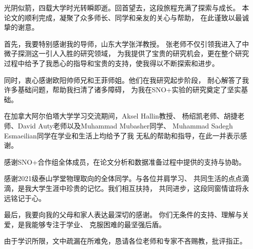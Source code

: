 \acknowledgment


光阴似箭，四载大学时光转瞬即逝。回首望去，这段旅程充满了探索与成长。
本论文的顺利完成，凝聚了众多师长、同学和亲友的关心与帮助，
在此谨致以最诚挚的谢意。

首先，我要特别感谢我的导师，山东大学张洋教授。
张老师不仅引领我进入了中微子探测这一引人入胜的研究领域，
为我提供了宝贵的研究机会，更在整个研究过程中给予了我悉心的指导和宝贵的支持，使我得以不断探索和进步。

同时，衷心感谢欧阳帅师兄和王菲师姐。他们在我研究起步阶段，
耐心解答了我许多基础问题，帮助我扫清了诸多障碍，
为我在SNO+实验的研究奠定了坚实基础。

在加拿大阿尔伯塔大学学习交流期间，Aksel Hallin教授、
杨绍凯老师、胡捷老师、David Auty老师以及Muhammad Mubasher同学、
Muhammad Sadegh Esmaeilian同学在学业和生活上均给予了我
无私的帮助和指导，在此一并表示感谢。

感谢SNO+合作组全体成员，在论文分析和数据准备过程中提供的支持与协助。

感谢2021级泰山学堂物理取向的全体同学。与各位并肩学习、
共同生活的点点滴滴，是我大学生涯中珍贵的记忆。我们相互扶持，
共同进步，这段同窗情谊将永远铭记于心。

最后，我要向我的父母和家人表达最深切的感谢。
你们无条件的支持、理解与关爱，是我能够专注于学业、
克服困难的最坚强后盾。

由于学识所限，文中疏漏在所难免，恳请各位老师和专家不吝赐教，批评指正。

